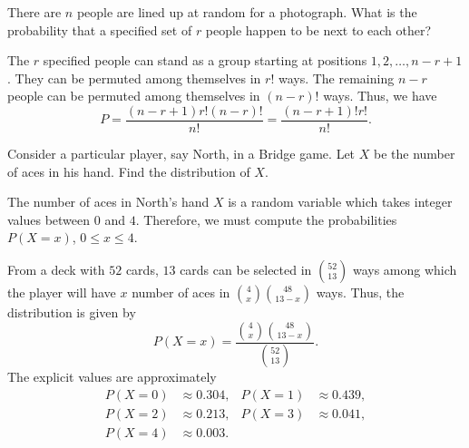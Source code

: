 \begin{problem}[Handout 1, \# 13]
  There are \(n\) people are lined up at random for a photograph. What is
  the probability that a specified set of \(r\) people happen to be next to
  each other?
\end{problem}
\begin{solution*}
  The \(r\) specified people can stand as a group starting at positions
  \(1,2,\dotsc,n-r+1\). They can be permuted among themselves in \(r!\)
  ways. The remaining \(n-r\) people can be permuted among themselves in
  \((n-r)!\) ways. Thus, we have
  \[
    P=\frac{(n-r+1)r!(n-r)!}{n!}=\frac{(n-r+1)!r!}{n!}.
  \]
\end{solution*}

\begin{problem}[Handout 1, \# 16]
  Consider a particular player, say North, in a Bridge game. Let \(X\) be
  the number of aces in his hand. Find the distribution of \(X\).
\end{problem}
\begin{solution*}
  The number of aces in North's hand \(X\) is a random variable which takes
  integer values between \(0\) and \(4\). Therefore, we must compute the
  probabilities \(P(X=x)\), \(0\leq x\leq 4\).

  From a deck with \(52\) cards, \(13\) cards can be selected in
  \(\binom{52}{13}\) ways among which the player will have \(x\) number of
  aces in \(\binom{4}{x}\binom{48}{13-x}\) ways. Thus, the distribution is
  given by
  \[
    P(X=x)=\frac{\binom{4}{x}\binom{48}{13-x}}{\binom{52}{13}}.
  \]
  The explicit values are approximately
  \begin{align*}
    P(X=0)&\approx 0.304,
    &P(X=1)&\approx 0.439,\\
    P(X=2)&\approx 0.213,
    &P(X=3)&\approx 0.041,\\
    P(X=4)&\approx 0.003.
  \end{align*}
\end{solution*}

